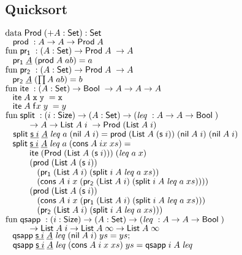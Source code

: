 \subsection{Quicksort}
\begin{bsp}
$\data \ProdT ( + A : \Set) : \Set$\\
$\spc  \prd : A \ra A \ra \ProdT A$\\
$\fun \pra : ( A : \Set ) \ra \ProdT A\; \ra A$\\
$\spc \pra \inacc{A}\; (\prd A\; a b) = a$\\
$\fun \prb : ( A : \Set ) \ra \ProdT A\; \ra A$\\
$\spc \prb \inacc{A}\; (\prod A\; a b) = b$\\
$\fun \ite : (A : \Set ) \ra \Bool \ra A \ra A \ra A$\\
$\spc \ite A\; \tt x\; y\; = x$\\
$\spc \ite A\; \ff x\; y\; = y$\\
$\fun \pivot : (i : \Size ) \ra (A : \Set ) \ra ( \lleq : A \ra A \ra \Bool )$\\ 
$\spcx	\ra A \ra \List A\; i\; \ra \ProdT (\List A\; i)$\\
$\spc\pivot \inacc{\s i}\;     \inacc{A}\; \lleq a\; (\nil A\; i) = \prd (\List A\; (\s i))\;(\nil A\; i)\;(\nil A\; i)$\\
$\spc \pivot \inacc{\s i}\;    \inacc{A}\; \lleq a\; (\cons A\; i x\; xs) =$\\ 
$\spcx     \ite (\ProdT (\List A\; (\s i)))\; (\lleq a\; x)$\\ 
$\spcx    (\prd (\List A\; (\s i))$\\
$\spcx \spc       (\pra (\List A\; i)\; (\pivot i\; A\; \lleq a\; xs)) $\\
$\spcx \spc	(\cons A\; i\; x\; (\prb (\List A\; i) \; (\pivot i\; A\; \lleq a\; xs))))$\\ 
$\spcx     (\prd (\List A\; (\s i))$\\
$\spcx	\spc (\cons A\; i\; x\; (\pra (\List A\; i)\; (\pivot i\; A\; \lleq a\; xs)))$\\
$\spcx  \spc (\prb (\List A\; i)\; (\pivot i\; A\; \lleq a\; xs)))$\\
$ \fun \qsapp : (i : \Size ) \ra ( A : \Set ) \ra ( \lleq : A \ra A \ra \Bool )$\\ 
$\spcx	\ra \List A\; i \ra \List A\; \infty \ra \List A\; \infty$\\
$\spc \qsapp \inacc{\s i}\; \inacc{A}\; \lleq (\nil A\; i) \;      ys = ys;$\\
$\spc \qsapp \inacc{\s i}\; \inacc{A}\; \lleq (\cons A\; i\; x\; xs) \; ys = \qsapp i\; A\; \lleq$\\ 

\end{bsp}
